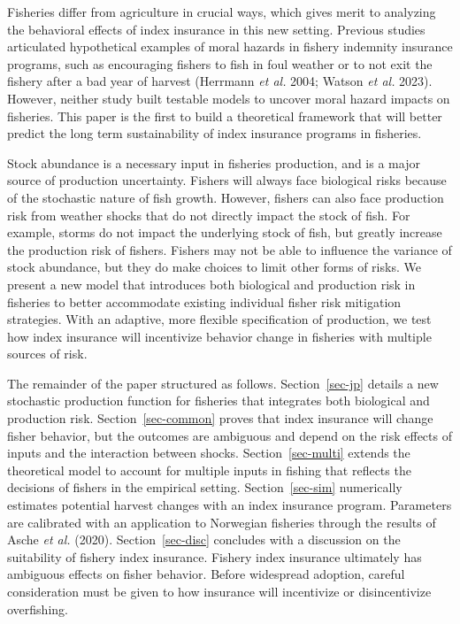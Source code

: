 \documentclass[
  letterpaper,
  DIV=11,
  numbers=noendperiod]{scrartcl}
\theoremstyle{plain}
\theoremstyle{plain}
\theoremstyle{remark}
\begin{document}
Fisheries differ from agriculture in crucial ways, which gives merit to
analyzing the behavioral effects of index insurance in this new setting.
Previous studies articulated hypothetical examples of moral hazards in
fishery indemnity insurance programs, such as encouraging fishers to
fish in foul weather or to not exit the fishery after a bad year of
harvest (Herrmann \emph{et al.} 2004; Watson \emph{et al.} 2023).
However, neither study built testable models to uncover moral hazard
impacts on fisheries. This paper is the first to build a theoretical
framework that will better predict the long term sustainability of index
insurance programs in fisheries.

Stock abundance is a necessary input in fisheries production, and is a
major source of production uncertainty. Fishers will always face
biological risks because of the stochastic nature of fish growth.
However, fishers can also face production risk from weather shocks that
do not directly impact the stock of fish. For example, storms do not
impact the underlying stock of fish, but greatly increase the production
risk of fishers. Fishers may not be able to influence the variance of
stock abundance, but they do make choices to limit other forms of risks.
We present a new model that introduces both biological and production
risk in fisheries to better accommodate existing individual fisher risk
mitigation strategies. With an adaptive, more flexible specification of
production, we test how index insurance will incentivize behavior change
in fisheries with multiple sources of risk.

The remainder of the paper structured as follows. Section~\ref{sec-jp}
details a new stochastic production function for fisheries that
integrates both biological and production risk. Section~\ref{sec-common}
proves that index insurance will change fisher behavior, but the
outcomes are ambiguous and depend on the risk effects of inputs and the
interaction between shocks. Section~\ref{sec-multi} extends the
theoretical model to account for multiple inputs in fishing that
reflects the decisions of fishers in the empirical setting.
Section~\ref{sec-sim} numerically estimates potential harvest changes
with an index insurance program. Parameters are calibrated with an
application to Norwegian fisheries through the results of Asche \emph{et
al.} (2020). Section~\ref{sec-disc} concludes with a discussion on the
suitability of fishery index insurance. Fishery index insurance
ultimately has ambiguous effects on fisher behavior. Before widespread
adoption, careful consideration must be given to how insurance will
incentivize or disincentivize overfishing.
\end{document}
